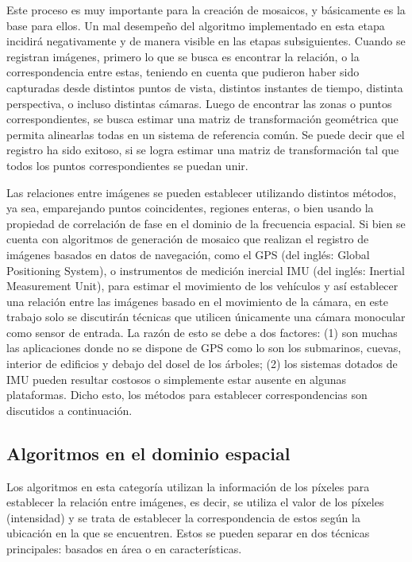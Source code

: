 Este proceso es muy importante para la creación de mosaicos, y básicamente es la base para ellos. Un mal desempeño del algoritmo implementado en esta etapa incidirá negativamente y de manera visible en las etapas subsiguientes. Cuando se registran imágenes, primero lo que se busca es encontrar la relación, o la correspondencia entre estas, teniendo en cuenta que pudieron haber sido capturadas desde distintos puntos de vista, distintos instantes de tiempo, distinta perspectiva, o incluso distintas cámaras. Luego de encontrar las zonas o puntos correspondientes, se busca estimar una matriz de transformación geométrica que permita alinearlas todas en un sistema de referencia común. Se puede decir que el registro ha sido exitoso, si se logra estimar una matriz de transformación tal que todos los puntos correspondientes se puedan unir.

Las relaciones entre imágenes se pueden establecer utilizando distintos métodos, ya sea, emparejando puntos coincidentes, regiones enteras, o bien usando la propiedad de correlación de fase en el dominio de la frecuencia espacial. Si bien se cuenta con algoritmos de generación de mosaico que realizan el registro de imágenes basados en datos de navegación, como el GPS (del inglés: Global Positioning System), o instrumentos de medición inercial IMU (del inglés: Inertial Measurement Unit), para estimar el movimiento de los vehículos y así establecer una relación entre las imágenes basado en el movimiento de la cámara, en este trabajo solo se discutirán técnicas que utilicen únicamente una cámara monocular como sensor de entrada. La razón de esto se debe a dos factores: (1) son muchas las aplicaciones donde no se dispone de GPS como lo son los submarinos, cuevas, interior de edificios y debajo del dosel de los árboles; (2) los sistemas dotados de IMU pueden resultar costosos o simplemente estar ausente en algunas plataformas. Dicho esto, los métodos para establecer correspondencias son discutidos a continuación.

\subsection*{Algoritmos en el dominio espacial}

Los algoritmos en esta categoría utilizan la información de los píxeles para establecer la relación entre imágenes, es decir, se utiliza el valor de los píxeles (intensidad) y se trata de establecer la correspondencia de estos según la ubicación en la que se encuentren. Estos se pueden separar en dos técnicas principales: basados en área o en características.

